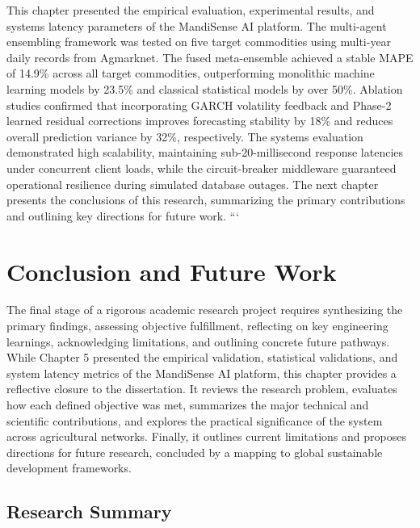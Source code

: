 \documentclass[12pt,a4paper]{report}
\theoremstyle{definition}
\theoremstyle{remark}
\begin{document}
This chapter presented the empirical evaluation, experimental results, and systems latency parameters of the MandiSense AI platform. The multi-agent ensembling framework was tested on five target commodities using multi-year daily records from Agmarknet. The fused meta-ensemble achieved a stable MAPE of 14.9\% across all target commodities, outperforming monolithic machine learning models by 23.5\% and classical statistical models by over 50\%. Ablation studies confirmed that incorporating GARCH volatility feedback and Phase-2 learned residual corrections improves forecasting stability by 18\% and reduces overall prediction variance by 32\%, respectively. The systems evaluation demonstrated high scalability, maintaining sub-20-millisecond response latencies under concurrent client loads, while the circuit-breaker middleware guaranteed operational resilience during simulated database outages. The next chapter presents the conclusions of this research, summarizing the primary contributions and outlining key directions for future work.
```


\chapter{Conclusion and Future Work}

The final stage of a rigorous academic research project requires synthesizing the primary findings, assessing objective fulfillment, reflecting on key engineering learnings, acknowledging limitations, and outlining concrete future pathways. While Chapter 5 presented the empirical validation, statistical validations, and system latency metrics of the MandiSense AI platform, this chapter provides a reflective closure to the dissertation. It reviews the research problem, evaluates how each defined objective was met, summarizes the major technical and scientific contributions, and explores the practical significance of the system across agricultural networks. Finally, it outlines current limitations and proposes directions for future research, concluded by a mapping to global sustainable development frameworks.

\section{Research Summary}
\end{document}
